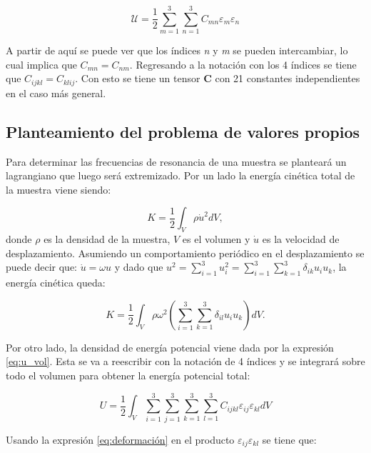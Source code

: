 \documentclass[12pt]{article}
\begin{document}
\begin{equation}
	\mathcal{U} = \frac{1}{2} \sum_{m=1}^{3}{\sum_{n=1}^{3}{C_{mn}\varepsilon_{m}\varepsilon_{n}}}
	\label{eq:u_vol}
\end{equation}

A partir de aquí se puede ver que los índices \textit{n} y \textit{m} se pueden intercambiar, lo cual implica que $C_{mn} = C_{nm}$. Regresando a la notación con los 4 índices se tiene que $C_{ijkl} = C_{klij}$. Con esto se tiene un tensor $\bm{C}$ con 21 constantes independientes en el caso más general. 


\subsection{Planteamiento del problema de valores propios}

Para determinar las frecuencias de resonancia de una muestra se planteará un lagrangiano que luego será extremizado. Por un lado la energía cinética total de la muestra viene siendo:

\begin{equation}
	K = \frac{1}{2} \int_{V}{\rho \dot{u}^2} dV,
\end{equation}
donde $\rho$ es la densidad de la muestra, $V$ es el volumen y $\dot{u}$ es la velocidad de desplazamiento. Asumiendo un comportamiento periódico en el desplazamiento se puede decir que: $\dot{u} = \omega{u}$ y dado que $u^2 = \sum_{i=1}^{3}{u_i^2} = \sum_{i=1}^{3}{\sum_{k=1}^{3}{\delta_{ik}u_i u_k}}$, la energía cinética queda:

\begin{equation}
	K = \frac{1}{2} \int_{V}{\rho \omega^2 \left(\sum_{i=1}^{3}{\sum_{k=1}^{3}{\delta_{il} u_i u_k}} \right) dV}.
	\label{eq:K}
\end{equation}

Por otro lado, la densidad de energía potencial viene dada por la expresión \ref{eq:u_vol}. Esta se va a reescribir con la notación de 4 índices y se integrará sobre todo el volumen para obtener la energía potencial total: 

\begin{equation}
	U = \frac{1}{2} \int_{V}{\sum_{i=1}^{3}\sum_{j=1}^{3}\sum_{k=1}^{3}\sum_{l=1}^{3}{C_{ijkl}\varepsilon_{ij}\varepsilon_{kl}}dV}
	\label{eq:U_raw}
\end{equation}

Usando la expresión \ref{eq:deformación} en el producto $\varepsilon_{ij}\varepsilon_{kl}$ se tiene que:
\end{document}
